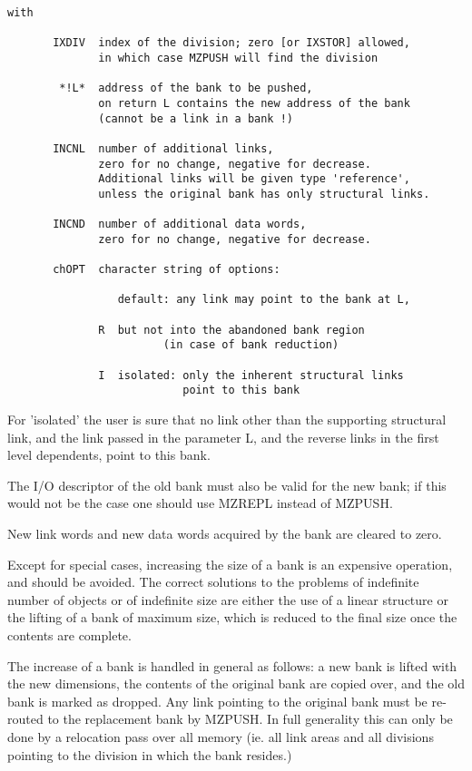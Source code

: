 \begin{verbatim}
with

       IXDIV  index of the division; zero [or IXSTOR] allowed,
              in which case MZPUSH will find the division

        *!L*  address of the bank to be pushed,
              on return L contains the new address of the bank
              (cannot be a link in a bank !)

       INCNL  number of additional links,
              zero for no change, negative for decrease.
              Additional links will be given type 'reference',
              unless the original bank has only structural links.

       INCND  number of additional data words,
              zero for no change, negative for decrease.

       chOPT  character string of options:

                 default: any link may point to the bank at L,

              R  but not into the abandoned bank region
                        (in case of bank reduction)

              I  isolated: only the inherent structural links
                           point to this bank
\end{verbatim} 
For 'isolated' the user is sure that no link other than the
supporting structural link, and the link passed in the parameter L,
and the reverse links in the first level dependents,
point to this bank.

The I/O descriptor of the old bank must also be valid for the
new bank; if this would not be the case one should use MZREPL instead
of MZPUSH.

New link words and new data words acquired by the bank
are cleared to zero.

Except for special cases,
increasing the size of a bank is an expensive operation,
and should be avoided.
The correct solutions to the problems of indefinite number of objects
or of indefinite size are either the use of a linear structure
or the lifting of a bank of maximum size,
which is reduced to the final size once the contents are complete.

The increase of a bank is handled in general as follows:
a new bank is lifted with the new dimensions,
the contents of the original bank are copied over,
and the old bank is marked as dropped.
Any link pointing to the original bank must be re-routed
to the replacement bank by MZPUSH.
In full generality this can only be done by a relocation pass
over all memory (ie. all link areas and all divisions pointing
to the division in which the bank resides.)

